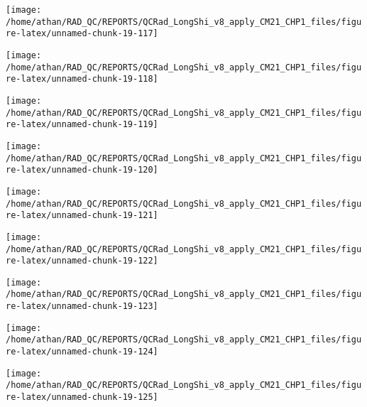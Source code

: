 \documentclass[
  10pt,
  a4paper,oneside]{article}
\begin{document}
\begin{center}\texttt{[image: /home/athan/RAD\_QC/REPORTS/QCRad\_LongShi\_v8\_apply\_CM21\_CHP1\_files/figure-latex/unnamed-chunk-19-117]} \end{center}

\begin{center}\texttt{[image: /home/athan/RAD\_QC/REPORTS/QCRad\_LongShi\_v8\_apply\_CM21\_CHP1\_files/figure-latex/unnamed-chunk-19-118]} \end{center}

\begin{center}\texttt{[image: /home/athan/RAD\_QC/REPORTS/QCRad\_LongShi\_v8\_apply\_CM21\_CHP1\_files/figure-latex/unnamed-chunk-19-119]} \end{center}

\begin{center}\texttt{[image: /home/athan/RAD\_QC/REPORTS/QCRad\_LongShi\_v8\_apply\_CM21\_CHP1\_files/figure-latex/unnamed-chunk-19-120]} \end{center}

\begin{center}\texttt{[image: /home/athan/RAD\_QC/REPORTS/QCRad\_LongShi\_v8\_apply\_CM21\_CHP1\_files/figure-latex/unnamed-chunk-19-121]} \end{center}

\begin{center}\texttt{[image: /home/athan/RAD\_QC/REPORTS/QCRad\_LongShi\_v8\_apply\_CM21\_CHP1\_files/figure-latex/unnamed-chunk-19-122]} \end{center}

\begin{center}\texttt{[image: /home/athan/RAD\_QC/REPORTS/QCRad\_LongShi\_v8\_apply\_CM21\_CHP1\_files/figure-latex/unnamed-chunk-19-123]} \end{center}

\begin{center}\texttt{[image: /home/athan/RAD\_QC/REPORTS/QCRad\_LongShi\_v8\_apply\_CM21\_CHP1\_files/figure-latex/unnamed-chunk-19-124]} \end{center}

\begin{center}\texttt{[image: /home/athan/RAD\_QC/REPORTS/QCRad\_LongShi\_v8\_apply\_CM21\_CHP1\_files/figure-latex/unnamed-chunk-19-125]} \end{center}
\end{document}

